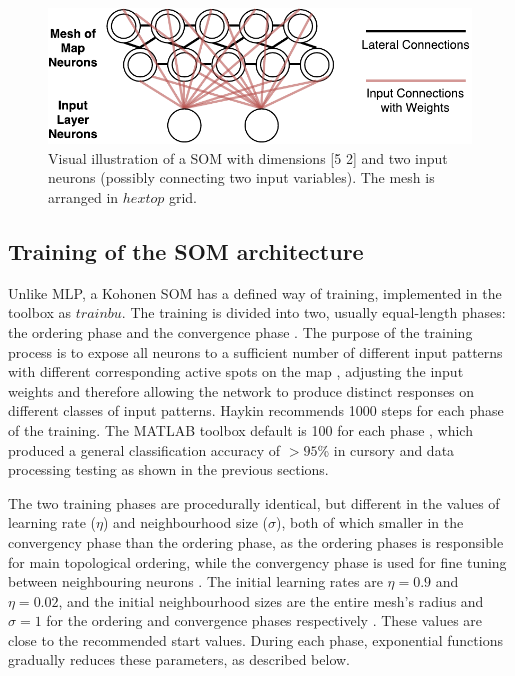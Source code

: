 \documentclass[10pt, oneside]{article}
\begin{document}
\begin{figure}[h]
\begin{center}
\includegraphics[width=12cm]{som-visual.pdf} 
\end{center}
\caption{\label{fig:som-visual} Visual illustration of a SOM with dimensions [5 2] and two input neurons (possibly connecting two input variables). The mesh is arranged in $hextop$ grid.}
\end{figure}

\subsection{Training of the SOM architecture} \label{subsec:training}
 
Unlike MLP, a Kohonen SOM has a defined way of training, implemented in the toolbox as $trainbu$. The training is divided into two, usually equal-length phases: the ordering phase and the convergence phase \cite[p. 23]{som-lecture}. The purpose of the training process is to expose all neurons to a sufficient number of different input patterns with different corresponding active spots on the map \cite[p. 429]{haykin2008}, adjusting the input weights and therefore allowing the network to produce distinct responses on different classes of input patterns. Haykin \cite[p. 435]{haykin2008} recommends 1000 steps for each phase of the training. The MATLAB toolbox default is 100 for each phase \cite{som-matlab}, which produced a general classification accuracy of $>95$\% in cursory and data processing testing as shown in the previous sections.

The two training phases are procedurally identical, but different in the values of learning rate ($\eta$) and neighbourhood size ($\sigma$), both of which smaller in the convergency phase than the ordering phase, as the ordering phases is responsible for main topological ordering, while the convergency phase is used for fine tuning between neighbouring neurons \cite[p. 23]{som-lecture}. The initial learning rates are $\eta=0.9$ and $\eta=0.02$, and the initial neighbourhood sizes are the entire mesh's radius and $\sigma=1$ for the ordering and convergence phases respectively \cite{newsom-matlab}. These values are close to the recommended start values\cite[p. 23]{som-lecture}. During each phase, exponential functions gradually reduces these parameters, as described below.
\end{document}
